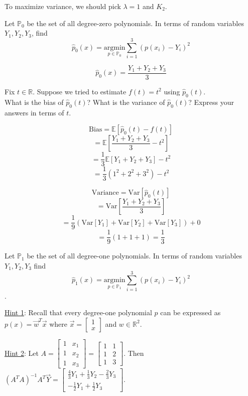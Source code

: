 \begin{Parts}
\begin{solution}
To maximize variance, we should pick $\lambda=1$ and $K_2$.
\end{solution}

\Part
Let $\mathbb{P}_0$ be the set of all degree-zero polynomials. In terms of random variables $Y_1, Y_2, Y_3$, find
$$ \hat{p}_0(x) = \underset{p \in \mathbb{P}_0}{\text{argmin}} \sum\limits_{i=1}^3
\left ( p(x_i) - Y_i \right )^2$$

\begin{solution}
$$\hat{p}_0(x) = \frac{Y_1 + Y_2 + Y_3}{3}$$
\end{solution}


\Part
Fix $t \in \mathbb{R}$. Suppose we tried to estimate $f(t)=t^2$ using $\hat{p}_0(t)$. \\
What is the bias of $\hat{p}_0(t)$? What is the variance of $\hat{p}_0(t)$? Express your answers in terms of $t$. \\

\begin{solution}
$$\text{Bias} = \mathbb{E}[\hat{p}_0(t) - f(t)]$$
$$ = \mathbb{E}[\frac{Y_1 + Y_2 + Y_3}{3} - t^2]$$
$$ = \frac{1}{3}\mathbb{E}[Y_1 + Y_2 + Y_3] - t^2$$
$$ = \frac{1}{3}(1^2 + 2^2 + 3^2) - t^2$$

$$\text{Variance} = \text{Var}[\hat{p}_0(t)]$$
$$ = \text{Var}[\frac{Y_1 + Y_2 + Y_3}{3}]$$
$$ = \frac{1}{9} \left (  \text{Var}[Y_1] + \text{Var}[Y_2] + \text{Var}[Y_3] \right ) + 0$$
$$ = \frac{1}{9} \left ( 1 + 1 + 1 \right ) = \frac{1}{3}$$
\end{solution}


\Part
Let $\mathbb{P}_1$ be the set of all degree-one polynomials. In terms of random variables $Y_1, Y_2, Y_3$ find
$$ \hat{p}_1(x) = \underset{p \in \mathbb{P}_1}{\text{argmin}} \sum\limits_{i=1}^3
\left ( p(x_i) - Y_i \right )^2$$.

\underline{Hint 1}: Recall that every degree-one polynomial $p$ can be expressed as $p(x) = \vec{w}^T \vec{x}$ where $\vec{x} = \begin{bmatrix} 1 \\ x \end{bmatrix}$ and $w \in \mathbb{R}^2$.

\underline{Hint 2}: Let $A = \begin{bmatrix} 1 & x_1 \\ 1 & x_2 \\ 1 & x_3 \end{bmatrix}
= \begin{bmatrix} 1 & 1 \\ 1 & 2 \\ 1 & 3 \end{bmatrix}$.
  Then $(A^T A)^{-1} A^T \vec{Y} =
  \begin{bmatrix} \frac{4}{3}Y_1 + \frac{1}{3}Y_2 - \frac{2}{3}Y_3 \\
    - \frac{1}{2}Y_1 + \frac{1}{2}Y_3
  \end{bmatrix}$.



\end{Parts}

